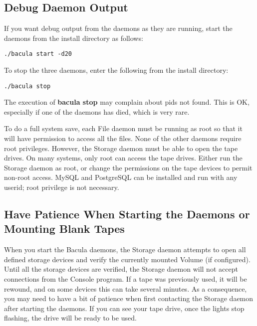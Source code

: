 {{\subsection*{Debug Daemon Output}

If you want debug output from the daemons as they are running, start the
daemons from the install directory as follows: 

\footnotesize
\begin{verbatim}
./bacula start -d20
\end{verbatim}
\normalsize

To stop the three daemons, enter the following from the install directory: 

\footnotesize
\begin{verbatim}
./bacula stop
\end{verbatim}
\normalsize

The execution of {\bf bacula stop} may complain about pids not found. This is
OK, especially if one of the daemons has died, which is very rare. 

To do a full system save, each File daemon must be running as root so that it
will have permission to access all the files. None of the other daemons
require root privileges. However, the Storage daemon must be able to open the
tape drives. On many systems, only root can access the tape drives. Either run
the Storage daemon as root, or change the permissions on the tape devices to
permit non-root access. MySQL and PostgreSQL can be installed and run with any
userid; root privilege is not necessary. 

\subsection*{Have Patience When Starting the Daemons or Mounting Blank Tapes}

When you start the Bacula daemons, the Storage daemon attempts to open all
defined storage devices and verify the currently mounted Volume (if
configured). Until all the storage devices are verified, the Storage daemon
will not accept connections from the Console program. If a tape was previously
used, it will be rewound, and on some devices this can take several minutes.
As a consequence, you may need to have a bit of patience when first contacting
the Storage daemon after starting the daemons. If you can see your tape drive,
once the lights stop flashing, the drive will be ready to be used. 

}}
